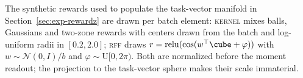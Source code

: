 The synthetic rewards used to populate the task-vector manifold in
Section~\ref{sec:exp-rewardz} are drawn per batch element: \textsc{kernel} mixes
balls, Gaussians and two-zone rewards with centers drawn from the batch and
log-uniform radii in $[0.2,2.0]$; \textsc{rff} draws
$r=\mathrm{relu}(\cos(w^{\top}\cube+\varphi))$ with $w\sim\mathcal{N}(0,I)/b$ and
$\varphi\sim\mathrm{U}[0,2\pi)$. Both are normalized before the moment readout;
the projection to the task-vector sphere makes their scale immaterial.
